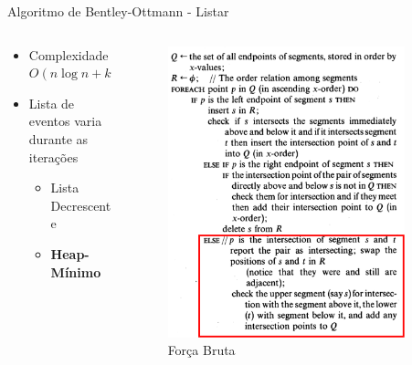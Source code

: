 \documentclass[aspectratio=169,usenames,dvipsnames]{beamer}
\begin{document}
\begin{frame}{Algoritmo de Bentley-Ottmann - Listar}
  \begin{columns}
      \begin{column}{0.5\textwidth}
        \begin{itemize}
          \item Complexidade $O(n \log n + k \log n )$ 
          \item Lista de eventos varia durante as iterações
          \begin{itemize}
            \item Lista Decrescente
            \item \textbf{Heap-Mínimo}
          \end{itemize}
        \end{itemize}
      \end{column}
      \begin{column}{0.5\textwidth}
      \begin{figure}
        \includegraphics[width=0.9\textwidth]{figs/bentley.png}
        \caption{Força Bruta}
      \end{figure}
      \end{column}
  \end{columns}
\end{frame}
\end{document}
